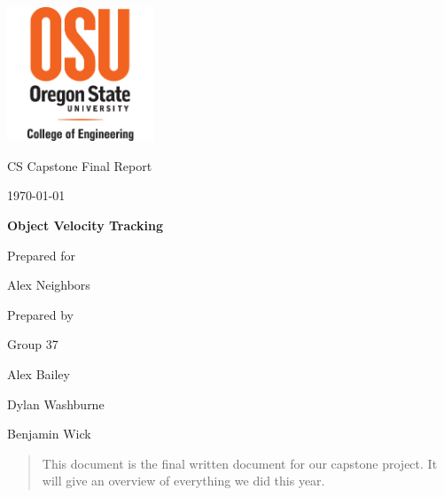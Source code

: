 \documentclass[onecolumn, draftclsnofoot,10pt, compsoc]{IEEEtran}
\def \CapstoneTeamName{			Velocity-Raptors}
\def \CapstoneTeamNumber{		37}
\def \GroupMemberOne{			Alex Bailey}
\def \GroupMemberTwo{			Dylan Washburne}
\def \GroupMemberThree{			Benjamin Wick}
\def \CapstoneProjectName{		Object Velocity Tracking}
\def \CapstoneSponsorCompany{}
\def \CapstoneSponsorPerson{		Alex Neighbors}
\def \DocType{		%
				Final Report
				}
\newcommand{\NameSigPair}[1]{\par
\makebox[2.75in][r]{#1} \hfil 	\makebox[3.25in]{\makebox[2.25in]{\hrulefill} \hfill		\makebox[.75in]{\hrulefill}}
\par\vspace{-12pt} \textit{\tiny\noindent
\makebox[2.75in]{} \hfil		\makebox[3.25in]{\makebox[2.25in][r]{Signature} \hfill	\makebox[.75in][r]{Date}}}}
\renewcommand{\NameSigPair}[1]{#1}
\begin{document}
\begin{titlepage}
    \begin{singlespace}
    	\includegraphics[height=4cm]{coe_v_spot1}
        \hfill 
        \par\vspace{.2in}
        \centering
        \scshape{
            \huge CS Capstone \DocType \par
            {\large\today}\par
            \vspace{.5in}
            \textbf{\Huge\CapstoneProjectName}\par
            \vfill
            {\large Prepared for}\par
            \Huge \CapstoneSponsorCompany\par
            \vspace{5pt}
            {\Large\NameSigPair{\CapstoneSponsorPerson}\par}
            {\large Prepared by }\par
            Group\CapstoneTeamNumber\par
            \vspace{5pt}
            {\Large
                \NameSigPair{\GroupMemberOne}\par
                \NameSigPair{\GroupMemberTwo}\par
                \NameSigPair{\GroupMemberThree}\par
            }
            \vspace{20pt}
        }
        \begin{abstract}
        	This document is the final written document for our capstone project. It will give an overview of everything we did this year.
            
        \end{abstract}     
    \end{singlespace}
\end{titlepage}
\newpage
{}
\tableofcontents
\clearpage
\end{document}
